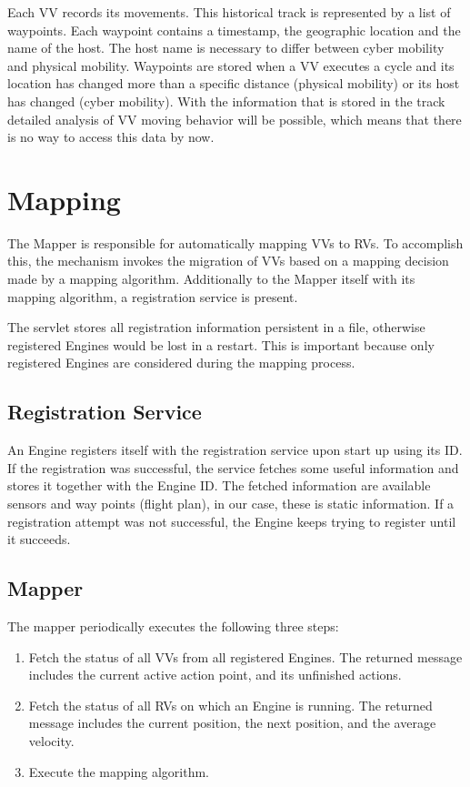 Each \ac{VV} records its movements. This historical track is represented by a list of waypoints. Each waypoint
contains a timestamp, the geographic location and the name of the host. The host name is necessary to differ between
cyber mobility and physical mobility. Waypoints are stored when a \ac{VV} executes a cycle and its location has
changed more than a specific distance (physical mobility) or its host has changed (cyber mobility). With the information
that is stored in the track detailed analysis of \ac{VV} moving behavior will be possible, which means that there is
no way to access this data by now.



\section{Mapping}
The Mapper is responsible for automatically mapping \acp{VV} to \acp{RV}. To accomplish this, the mechanism invokes 
the migration of \acp{VV} based on a mapping decision made by a mapping algorithm.
Additionally to the Mapper itself with its mapping algorithm, a registration service is present.

The servlet stores all registration information persistent in a file, otherwise registered Engines would be lost in
a restart. This is important because only registered Engines are considered during the mapping process.

\subsection{Registration Service}
An Engine registers itself with the registration service upon start up using its ID. If the registration was successful, the service
fetches some useful information and stores it together with the Engine ID. The fetched information are available sensors
and way points (flight plan), in our case, these is static information. If a registration attempt was not successful, the
Engine keeps trying to register until it succeeds.

\subsection{Mapper}
The mapper periodically executes the following three steps: 

\begin{enumerate}
  \item Fetch the status of all \acp{VV} from all registered Engines.
  The returned message includes the current active action point, and its unfinished actions.
  
  \item Fetch the status of all \acp{RV} on which an Engine is running.
  The returned message includes the current position, the next position, and the average velocity.
  
  \item Execute the mapping algorithm.
\end{enumerate}

